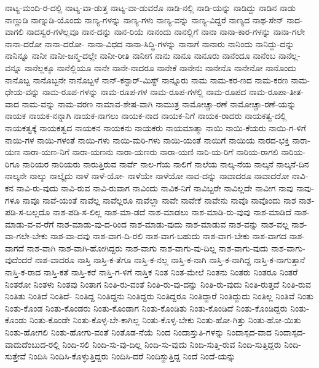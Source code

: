 {ನಾಟ್ಯ-ಮಂದಿ-ರ-ದಲ್ಲಿ
ನಾಟ್ಯ-ವಾ-ಡುತ್ತ
ನಾಟ್ಯ-ವಾ-ಡುವರೊ
ನಾಡಿ-ನಲ್ಲಿ
ನಾಡಿ-ಯನ್ನು
ನಾಡಿದ್ದು
ನಾಡಿನ
ನಾಡು
ನಾಣ್ಣುಡಿ
ನಾಣ್ನುಡಿ-ಯೊಂದು
ನಾಣ್ಯ-ಗಳನ್ನು
ನಾಣ್ಯ-ಗಳು
ನಾಣ್ಯ-ವನ್ನು
ನಾಣ್ಯ-ವಿದ್ದರೆ
ನಾಣ್ಯದ
ನಾಥ-ಸೇನ್
ನಾದ-ವಾಗಲಿ
ನಾದಸ್ವರ-ಗಳೆಲ್ಲವೂ
ನಾನ-ದನ್ನು
ನಾನ-ರಿಯೆ
ನಾನಂದು
ನಾನಲ್ಲಿಗೆ
ನಾನಾ
ನಾನಾ-ಕಾರ-ಗಳನ್ನು
ನಾನಾ-ಗಲೇ
ನಾನಾ-ದರೋ
ನಾನಾ-ದರೋ-
ನಾನಾ-ವಿಧದ
ನಾನಾ-ಸಿದ್ಧಿ-ಗಳನ್ನು
ನಾನಾಗೆ
ನಾನಾರು
ನಾನಿಂದು
ನಾನಿದ್ದು-ದನ್ನು
ನಾನಿನ್ನೂ
ನಾನೀ
ನಾನೀ-ಜನ್ಮ-ದಲ್ಲೇ
ನಾನೀ-ರೀತಿ
ನಾನೀಗ
ನಾನು
ನಾನೂ
ನಾನೂರು
ನಾನೆಂದೂ
ನಾನೆಂಬ
ನಾನೆಲ್ಲ-ವನ್ನೂ
ನಾನೆಲ್ಲಕ್ಕೂ
ನಾನೆಲ್ಲಿಯೂ
ನಾನೇ
ನಾನೇ-ನಾದರೂ
ನಾನೇಕೆ
ನಾನೇನು
ನಾನೇನೊ
ನಾನೇನೋ
ನಾನೊಂದು
ನಾನೊಬ್ಬ
ನಾನೊಬ್ಬನೇ
ನಾನೊಬ್ಬಳೆ
ನಾನ್-ಕನ್ಫಾರ್-ಮಿಸ್ಟ್
ನಾನ್ನೂರು
ನಾಮ
ನಾಮ-ಕರ-ಣದ
ನಾಮ-ಕರಣ
ನಾಮ-ಧೇಯ-ವನ್ನು
ನಾಮ-ರೂಪ-ಗಳನ್ನು
ನಾಮ-ರೂಪ-ಗಳ
ನಾಮ-ರೂಪ-ಗಳಲ್ಲಿ
ನಾಮ-ರೂಪದ
ನಾಮ-ರೂಪಾ-ತೀತ-ವಾದ
ನಾಮ-ವನ್ನು
ನಾಮ-ವರಣ
ನಾಮಾವ-ಶೇಷ-ವಾಗಿ
ನಾಮುತ್ರ
ನಾಮೋಚ್ಚಾ-ರಣೆ
ನಾಮೋಚ್ಚಾ-ರಣೆ-ಯನ್ನು
ನಾಯಕ
ನಾಯಕ-ನನ್ನಾಗಿ
ನಾಯಕ-ನಾಗಲು
ನಾಯಕ-ನಾದ
ನಾಯಕ-ನಿಗೆ
ನಾಯಕ-ರಾದರು
ನಾಯಕತ್ವ-ದಲ್ಲಿ
ನಾಯಕತ್ವಕ್ಕೆ
ನಾಯಕತ್ವದ
ನಾಯಕನ
ನಾಯಕನು
ನಾಯಕರು
ನಾಯಮಾತ್ಮಾ
ನಾಯಿ
ನಾಯಿ-ಕೆಯರು
ನಾಯಿ-ಗ-ಳಿಗೆ
ನಾಯಿ-ಗಳ
ನಾಯಿ-ಗಳಂತೆ
ನಾಯಿ-ಗಳು
ನಾಯಿ-ಮರಿ-ಗಳು
ನಾಯಿ-ಯಂತೆ
ನಾಯಿಗೆ
ನಾಯಿಯ
ನಾರದ-ಭಕ್ತಿ
ನಾರಾ-ಯಣ
ನಾರಾ-ಯಣ-ನಿಗೆ
ನಾರಾ-ಯಣನು
ನಾರಾ-ಯಣರು
ನಾರಾ-ಯಣಿ
ನಾರಿ-ಯ-ರಿಗೆ
ನಾರಿಯ-ರಾಗಲಿ
ನಾರಿಯ-ರಿಗೂ
ನಾರಿಯರ
ನಾರಿಯರು
ನಾರುತ್ತಿರುವ
ನಾರ್ವೆ
ನಾಲ-ಗೆಯ
ನಾಲಿಗೆ
ನಾಲೆಯ
ನಾಲ್ಕ-ನೆಯ
ನಾಲ್ಕನೆ
ನಾಲ್ಕನೆ-ದಿನ
ನಾಲ್ಕನೇ
ನಾಲ್ಕು
ನಾಲ್ಕೈದು
ನಾಳೆ
ನಾಳೆ-ಯೋ-
ನಾಳೆಯೇ
ನಾಳೆಯೋ
ನಾವ-ದನ್ನು
ನಾವಾದರೂ
ನಾವಾದರೋ
ನಾವಿ-ಕನ
ನಾವಿ-ರು-ವುದು
ನಾವಿ-ರುವ
ನಾವಿ-ರುವಾಗ
ನಾವಿಂದು
ನಾವಿಕ-ನಿಗೆ
ನಾವಿಬ್ಬರೇ
ನಾವಿಲ್ಲದೇ
ನಾವೀಗ
ನಾವು
ನಾವು-ಗಳೂ
ನಾವೂ
ನಾವೆ-ಯಂತೆ
ನಾವೆಲ್ಲ
ನಾವೆಲ್ಲರೂ
ನಾವೆಲ್ಲಾ
ನಾವೇ
ನಾವೇಕೆ
ನಾವೇನು
ನಾವೊ
ನಾವೊಂದು
ನಾಶ
ನಾಶ-ಪಡಿ-ಸ-ಬಲ್ಲದೊ
ನಾಶ-ಪಡಿ-ಸ-ಲಿಲ್ಲ
ನಾಶ-ಮಾ-ಡದೆ
ನಾಶ-ಮಾಡಲು
ನಾಶ-ಮಾಡಿ-ರು-ವುವು
ನಾಶ-ಮಾಡಿದೆ
ನಾಶ-ಮಾಡು-ವ-ವ-ರೆಗೆ
ನಾಶ-ಮಾಡು-ವು-ದ-ರಿಂದ
ನಾಶ-ಮಾಡು-ವುದು
ನಾಶ-ಮಾಡುವ
ನಾಶ-ವನ್ನು
ನಾಶ-ವಲ್ಲ
ನಾಶ-ವಾ-ಗಲೇ-ಬೇಕು
ನಾಶ-ವಾ-ದವು
ನಾಶ-ವಾಗ-ದಿ-ರಲಿ
ನಾಶ-ವಾಗ-ಬಹುದು
ನಾಶ-ವಾಗ-ಬೇಕು
ನಾಶ-ವಾಗದ
ನಾಶ-ವಾಗದೆ
ನಾಶ-ವಾಗಿ
ನಾಶ-ವಾಗಿ-ಹೋಗಿದ್ದರು
ನಾಶ-ವಾಗು
ನಾಶ-ವಾಗು-ವು-ದಿಲ್ಲ
ನಾಶ-ವಾಗು-ವುದು
ನಾಶ-ವಾಗು-ವುದೆಂದರೆ
ನಾಶ-ವಾದರೂ
ನಾಸ್ತಿ
ನಾಸ್ತಿ-ಕ-ತೆಗೂ
ನಾಸ್ತಿ-ಕ-ನಲ್ಲ
ನಾಸ್ತಿ-ಕ-ನಾಗಿ
ನಾಸ್ತಿ-ಕ-ನಾಗಿದ್ದ
ನಾಸ್ತಿ-ಕ-ನಾಗುತ್ತಾನೆ
ನಾಸ್ತಿ-ಕ-ರಾದ
ನಾಸ್ತಿ-ಕತೆ
ನಾಸ್ತಿ-ಕರೆ
ನಾಸ್ತಿ-ಗ-ಳಿಗೆ
ನಾಸ್ತಿಕ
ನಿಂತ
ನಿಂತ-ಮೇಲೆ
ನಿಂತನು
ನಿಂತರು
ನಿಂತರೂ
ನಿಂತರೆ
ನಿಂತರೋ
ನಿಂತಳು
ನಿಂತವು
ನಿಂತಾಗ
ನಿಂತಿ-ರು-ವಂತೆ
ನಿಂತಿ-ರು-ವು-ದನ್ನು
ನಿಂತಿ-ರು-ವುದು
ನಿಂತಿ-ರುತ್ತದೆ
ನಿಂತಿ-ರುವ
ನಿಂತಿತು
ನಿಂತಿದೆ
ನಿಂತಿದೆ-
ನಿಂತಿದ್ದ
ನಿಂತಿದ್ದನು
ನಿಂತಿದ್ದರು
ನಿಂತಿದ್ದರೂ
ನಿಂತಿದ್ದಾರೆ
ನಿಂತಿದ್ದುದು
ನಿಂತಿಲ್ಲ
ನಿಂತಿವೆ
ನಿಂತು
ನಿಂತು-ಕೊಂಡ
ನಿಂತು-ಕೊಂಡರು
ನಿಂತು-ಕೊಂಡಾಗ
ನಿಂತು-ಕೊಂಡಿತು
ನಿಂತು-ಕೊಂಡಿದೆ
ನಿಂತು-ಕೊಂಡಿದ್ದರು
ನಿಂತು-ಕೊಂಡು
ನಿಂತು-ಕೊಂಡೇ
ನಿಂತು-ಕೊಳ್ಳ-ಬೇ-ಕಾಗಿಲ್ಲ
ನಿಂತು-ಕೊಳ್ಳ-ಬೇಕು
ನಿಂತು-ಹೋ-ಗಿತ್ತು
ನಿಂತು-ಹೋ-ಯಿತು
ನಿಂತು-ಹೋಗಲಿ
ನಿಂತು-ಹೋಗು-ವಂತೆ
ನಿಂತೊಡ-ನೆಯೆ
ನಿಂದ
ನಿಂದಾಸ್ತುತಿ-ಗಳನ್ನು
ನಿಂದಾಸ್ಪದ-ವಾದ
ನಿಂದಾಸ್ಪದ-ವಾದುದೆಂಬುದ-ರಲ್ಲಿ
ನಿಂದಿ-ಸಲಿ
ನಿಂದಿ-ಸು-ವು-ದಿಲ್ಲ
ನಿಂದಿ-ಸು-ವುದು
ನಿಂದಿ-ಸುತ್ತಿ-ರುವ
ನಿಂದಿ-ಸುತ್ತಿದ್ದರು
ನಿಂದಿ-ಸುತ್ತೇವೆ
ನಿಂದಿಸಿ
ನಿಂದಿಸಿ-ಕೊಳ್ಳುತ್ತಿದ್ದರು
ನಿಂದಿಸಿ-ದರೆ
ನಿಂದಿಸ್ದುತ್ತಿದ್ದ
ನಿಂದೆ
ನಿಂದೆ-ಯನ್ನು
}
